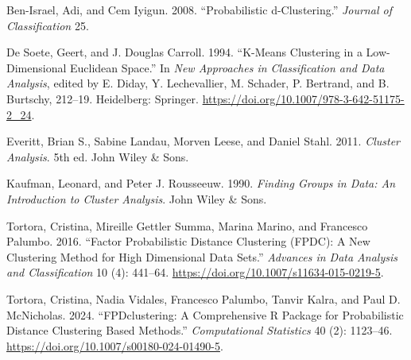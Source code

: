 \documentclass[
  11pt,
  letterpaper,
  DIV=11,
  numbers=noendperiod]{scrartcl}
\newlength{\cslhangindent}
\newenvironment{CSLReferences}[2] %
 {\begin{list}{}{%
  \setlength{\itemindent}{0pt}
  \setlength{\leftmargin}{0pt}
  \setlength{\parsep}{0pt}
  \ifodd #1
   \setlength{\leftmargin}{\cslhangindent}
   \setlength{\itemindent}{-1\cslhangindent}
  \fi
  \setlength{\itemsep}{#2\baselineskip}}}
 {\end{list}}
\begin{document}
\label{refs}
\begin{CSLReferences}{1}{0}
Ben-Israel, Adi, and Cem Iyigun. 2008. {``Probabilistic d-Clustering.''}
\emph{Journal of Classification} 25.

De Soete, Geert, and J. Douglas Carroll. 1994. {``K-Means Clustering in
a Low-Dimensional {Euclidean} Space.''} In \emph{New Approaches in
Classification and Data Analysis}, edited by E. Diday, Y. Lechevallier,
M. Schader, P. Bertrand, and B. Burtschy, 212--19. Heidelberg: Springer.
\url{https://doi.org/10.1007/978-3-642-51175-2_24}.

Everitt, Brian S., Sabine Landau, Morven Leese, and Daniel Stahl. 2011.
\emph{Cluster Analysis}. 5th ed. John Wiley \& Sons.

Kaufman, Leonard, and Peter J. Rousseeuw. 1990. \emph{Finding Groups in
Data: An Introduction to Cluster Analysis}. John Wiley \& Sons.

Tortora, Cristina, Mireille Gettler Summa, Marina Marino, and Francesco
Palumbo. 2016. {``Factor Probabilistic Distance Clustering ({FPDC}): A
New Clustering Method for High Dimensional Data Sets.''} \emph{Advances
in Data Analysis and Classification} 10 (4): 441--64.
\url{https://doi.org/10.1007/s11634-015-0219-5}.

Tortora, Cristina, Nadia Vidales, Francesco Palumbo, Tanvir Kalra, and
Paul D. McNicholas. 2024. {``{FPDclustering}: A Comprehensive {R}
Package for Probabilistic Distance Clustering Based Methods.''}
\emph{Computational Statistics} 40 (2): 1123--46.
\url{https://doi.org/10.1007/s00180-024-01490-5}.

\end{CSLReferences}
\end{document}
